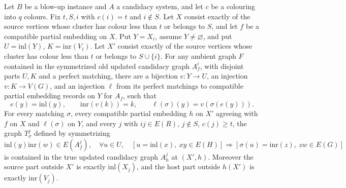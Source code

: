 \begin{lemma}
Let $B$ be a blow-up instance and $A$ a candidacy system, and let $c$
be a colouring into $q$ colours. Fix $t,S,i$ with $c(i)=t$ and $i\notin S$.
Let $X$ consist exactly of the source vertices whose cluster has colour
less than $t$ or belongs to $S$, and let $f$ be a compatible partial
embedding on $X$. Put $Y=X_i$, assume $Y\ne\varnothing$, and put
$U=\mathrm{inl}(Y)$, $K=\mathrm{inr}(V_i)$.
Let $X'$ consist exactly of the source vertices whose cluster has colour
less than $t$ or belongs to $S\cup\{i\}$.
For any ambient graph $F$ contained in the symmetrized old updated
candidacy graph $A_f^i$, with disjoint parts $U,K$ and a perfect matching,
there are a bijection $e:Y\to U$, an injection $v:K\to V(G)$, and an
injection $\ell$ from its perfect matchings to compatible partial
embedding records on $Y$ for $A_f$, such that
\[
 e(y)=\mathrm{inl}(y),\qquad
 \mathrm{inr}(v(k))=k,\qquad
 \ell(\sigma)(y)=v(\sigma(e(y))).
\]
For every matching $\sigma$, every compatible partial embedding $h$ on
$X'$ agreeing with $f$ on $X$ and $\ell(\sigma)$ on $Y$, and every $j$
with $ij\in E(R)$, $j\notin S$, $c(j)\ge t$, the graph $T^j_\sigma$
defined by symmetrizing
\[
 \mathrm{inl}(y)\mathrm{inr}(w)\in E(A_f^j),\quad
 \forall u\in U,\quad
 [u=\mathrm{inl}(x),\ xy\in E(H)]\Longrightarrow
 [\sigma(u)=\mathrm{inr}(z),\ zw\in E(G)]
\]
is contained in the true updated candidacy graph $A_h^j$ at $(X',h)$.
Moreover the source part outside $X'$ is exactly $\mathrm{inl}(X_j)$,
and the host part outside $h(X')$ is exactly $\mathrm{inr}(V_j)$.
\end{lemma}
